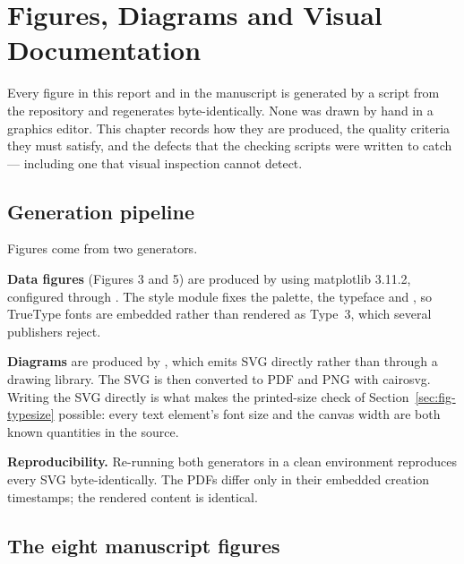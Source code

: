 \chapter{Figures, Diagrams and Visual Documentation}\label{ch:figures}

Every figure in this report and in the manuscript is generated by a script from the repository
and regenerates byte-identically. None was drawn by hand in a graphics editor. This chapter
records how they are produced, the quality criteria they must satisfy, and the defects that the
checking scripts were written to catch --- including one that visual inspection cannot detect.

\section{Generation pipeline}

Figures come from two generators.

\textbf{Data figures} (Figures 3 and 5) are produced by
 using matplotlib 3.11.2, configured through
. The style module fixes the palette, the typeface and
, so TrueType fonts are embedded rather than rendered as Type~3, which
several publishers reject.

\textbf{Diagrams} are produced by , which emits SVG
directly rather than through a drawing library. The SVG is then converted to PDF and PNG with
cairosvg. Writing the SVG directly is what makes the printed-size check of
Section~\ref{sec:fig-typesize} possible: every text element's font size and the canvas width are
both known quantities in the source.

\textbf{Reproducibility.} Re-running both generators in a clean environment reproduces every SVG
byte-identically. The PDFs differ only in their embedded creation timestamps; the rendered
content is identical.

\section{The eight manuscript figures}

